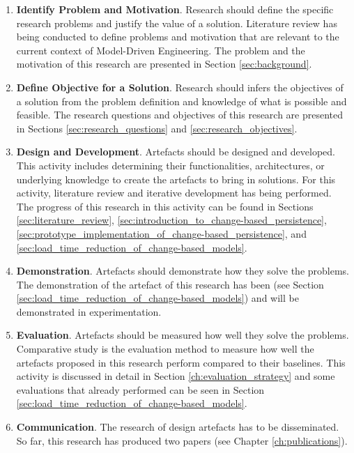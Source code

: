 \documentclass[12pt, a4paper]{report} \usepackage[titletoc]{appendix}
\begin{document}
\begin{enumerate}
	\item \textbf{Identify Problem and Motivation}. Research should define the specific research problems and justify the value of a solution. Literature review has being conducted to define problems and motivation that are relevant to the current context of Model-Driven Engineering. The problem and the motivation of this research are presented in Section \ref{sec:background}.   
	\item \textbf{Define Objective for a Solution}. Research should infers the objectives of a solution from the problem definition and knowledge of what is possible and feasible. The research questions and objectives of this research are presented in Sections \ref{sec:research_questions} and \ref{sec:research_objectives}.
	\item \textbf{Design and Development}. Artefacts should be designed and developed. This activity includes determining their functionalities, architectures, or underlying knowledge to create the artefacts to bring in solutions. For this activity, literature review and iterative development has being performed. The progress of this research in this activity can be found in Sections \ref{sec:literature_review}, \ref{sec:introduction_to_change-based_persistence}, \ref{sec:prototype_implementation_of_change-based_persistence}, and \ref{sec:load_time_reduction_of_change-based_models}. 
	\item \textbf{Demonstration}. Artefacts should demonstrate how they solve the problems. The demonstration of the artefact of this research has been (see Section \ref{sec:load_time_reduction_of_change-based_models}) and will be demonstrated in experimentation. 
	\item \textbf{Evaluation}. Artefacts should be measured how well they solve the problems. Comparative study is the evaluation method to measure how well the artefacts proposed in this research perform compared to their baselines. This activity is discussed in detail in Section \ref{ch:evaluation_strategy} and some evaluations that already performed can be seen in Section \ref{sec:load_time_reduction_of_change-based_models}.
	\item \textbf{Communication}. The research of design artefacts has to be disseminated. So far, this research has produced two papers (see Chapter \ref{ch:publications}). 
\end{enumerate}
\end{document}
